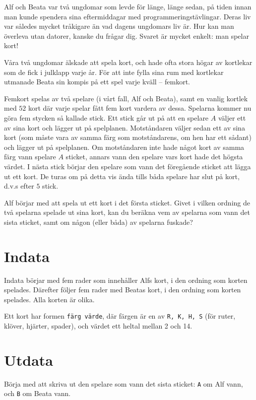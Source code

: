Alf och Beata var två ungdomar som levde för länge, länge sedan, på tiden innan man kunde spendera sina eftermiddagar med programmeringstävlingar.
Deras liv var således mycket tråkigare än vad dagens ungdomars liv är.
Hur kan man överleva utan datorer, kanske du frågar dig.
Svaret är mycket enkelt: man spelar kort!

Våra två ungdomar älskade att spela kort, och hade ofta stora högar av kortlekar som de fick i julklapp varje år.
För att inte fylla sina rum med kortlekar utmanade Beata sin kompis på ett spel varje kväll -- femkort.

Femkort spelas av två spelare (i vårt fall, Alf och Beata), samt en vanlig kortlek med $52$ kort där varje spelar fått fem kort vardera av dessa.
Spelarna kommer nu göra fem stycken så kallade stick.
Ett stick går ut på att en spelare $A$ väljer ett av sina kort och lägger ut på spelplanen.
Motståndaren väljer sedan ett av sina kort (som måste vara av samma färg som motståndarens, om hen har ett sådant) och lägger ut på spelplanen.
Om motståndaren inte hade något kort av samma färg vann spelare $A$ sticket, annars vann den spelare vars kort hade det högsta värdet.
I nästa stick börjar den spelare som vann det föregående sticket att lägga ut ett kort.
De turas om på detta vis ända tills båda spelare har slut på kort, d.v.s efter $5$ stick.

Alf börjar med att spela ut ett kort i det första sticket.
Givet i vilken ordning de två spelarna spelade ut sina kort, kan du beräkna vem av spelarna som vann det sista sticket, samt om någon (eller båda) av spelarna fuskade?

\section*{Indata}
Indata börjar med fem rader som innehåller Alfs kort, i den ordning som korten spelades.
Därefter följer fem rader med Beatas kort, i den ordning som korten spelades. Alla korten är olika.

Ett kort har formen \texttt{färg värde}, där färgen är en av \texttt{R, K, H, S} (för ruter, klöver, hjärter, spader), och värdet ett heltal mellan 2 och 14. 

\section*{Utdata}
Börja med att skriva ut den spelare som vann det sista sticket: \texttt{A} om Alf vann, och \texttt{B} om Beata vann.

